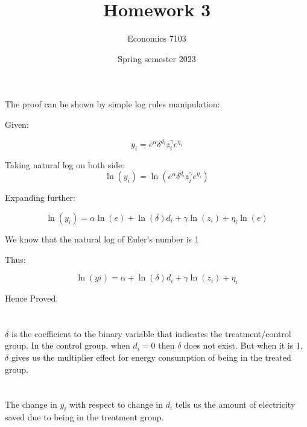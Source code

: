\documentclass{article}
\title{Homework 3 }
\author{Economics 7103}
\date{Spring semester 2023}
\begin{document}
  
\maketitle

\section{}
The proof can be shown by simple log rules manipulation:\newline

Given:

\begin{equation}
y_i = e^\alpha\delta^{d_i}z^\gamma_ie^{\eta_i}
\end{equation}

Taking natural log on both side:
\begin{equation}
    \ln(y_i) = \ln(e^\alpha\delta^{d_i}z^\gamma_ie^{\eta_i})
\end{equation}

Expanding further:

\begin{equation}
\ln(y_i) = \alpha\ln(e) + \ln(\delta)d_i + \gamma\ln(z_i) + \eta_i\ln(e)      
\end{equation}
\newline

We know that the natural log of Euler's number is 1 
\newline

Thus:

\begin{equation}
    \ln(yi) = \alpha + \ln(\delta)d_i + \gamma\ln(z_i) + \eta_i
\end{equation}

Hence Proved.
\newline
\newline

\section{}
 \(\delta\) is the coefficient to the binary variable that indicates the treatment/control 
group. In the control group, when $d_i = 0$ then \(\delta\) does not exist. But when it is 1, \(\delta\) gives us the multiplier effect for energy consumption of being in the treated group.   
\newline
\newline

\section{}
The change in $y_i$ with respect to change in $d_i$ tells us the amount of electricity saved due to being in the treatment group.
\newline
\end{document}
